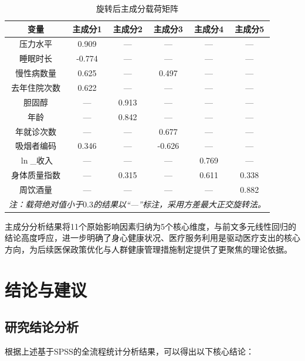 \documentclass[a4paper]{ctexart}
\begin{document}
\begin{table}[H]
\centering
\caption{旋转后主成分载荷矩阵}
\label{tab:pca_load}
\begin{tabular}{cccccc}
\toprule
变量 & 主成分1 & 主成分2 & 主成分3 & 主成分4 & 主成分5 \\
\midrule
压力水平 & 0.909 & — & — & — & — \\
睡眠时长 & -0.774 & — & — & — & — \\
慢性病数量 & 0.625 & — & 0.497 & — & — \\
去年住院次数 & 0.622 & — & — & — & — \\
胆固醇 & — & 0.913 & — & — & — \\
年龄 & — & 0.842 & — & — & — \\
年就诊次数 & — & — & 0.677 & — & — \\
吸烟者编码 & 0.346 & — & -0.626 & — & — \\
\(\ln\)\_收入 & — & — & — & 0.769 & — \\
身体质量指数 & — & 0.315 & — & 0.611 & 0.338 \\
周饮酒量 & — & — & — & — & 0.882 \\
\bottomrule
\multicolumn{6}{l}{\textit{注：载荷绝对值小于$0.3$的结果以“—”标注，采用方差最大正交旋转法。}}
\end{tabular}
\end{table}

主成分分析结果将11个原始影响因素归纳为5个核心维度，与前文多元线性回归的结论高度呼应，进一步明确了身心健康状况、医疗服务利用是驱动医疗支出的核心方向，为后续医保政策优化与人群健康管理措施制定提供了更聚焦的理论依据。

\section{结论与建议}

\subsection{研究结论分析}

根据上述基于SPSS的全流程统计分析结果，可以得出以下核心结论：
\end{document}
